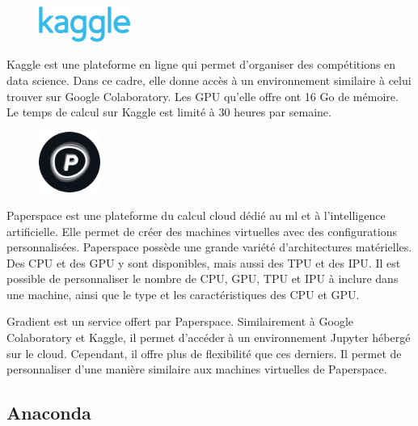 \begin{figure}
    \vspace*{-\topsep}
    \begin{flushright}
        \includegraphics[width=3cm]{assets/images/Kaggle_logo.png}
    \end{flushright}
\end{figure}
Kaggle est une plateforme en ligne qui permet d'organiser des compétitions en data science.
Dans ce cadre, elle donne accès à un environnement similaire à celui trouver sur Google Colaboratory.
Les GPU qu'elle offre ont 16 Go de mémoire.
Le temps de calcul sur Kaggle est limité à 30 heures par semaine.


\begin{figure}
    \vspace*{-\topsep}
    \begin{flushright}
        \includegraphics[width=2cm]{assets/images/paperspace.png}
    \end{flushright}
\end{figure}
Paperspace est une plateforme du calcul cloud dédié au \gls{ml} et à l'intelligence artificielle.
Elle permet de créer des machines virtuelles avec des configurations personnalisées.
Paperspace possède une grande variété d'architectures matérielles.
Des CPU et des GPU y sont disponibles, mais aussi des TPU et des IPU.
Il est possible de personnaliser le nombre de CPU, GPU, TPU et IPU à inclure dans une  machine,
ainsi que le type et les caractéristiques des CPU et GPU.

Gradient est un service offert par Paperspace.
Similairement à Google Colaboratory et Kaggle, il permet d'accéder à un environnement Jupyter hébergé sur le cloud.
Cependant, il offre plus de flexibilité que ces derniers.
Il permet de personnaliser d'une manière similaire aux machines virtuelles de Paperspace.
\ \\

\subsection{Anaconda}
\label{subsec.anaconda}

